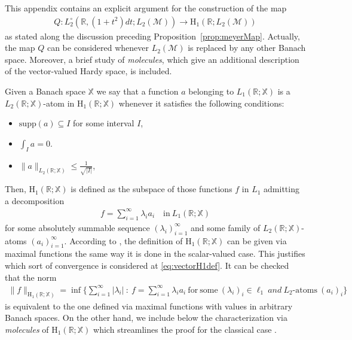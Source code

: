 \documentclass[psamsfonts]{amsart}
\newcommand{\R}{\mathbb{R}}
\newcommand{\Lone}{L_1}
\newcommand{\Ltwo}{L_2}
\newcommand{\Ltwozero}{L_2^\circ}
\newcommand{\Hone}{\mathrm{H}_1}
\begin{document}
    This appendix contains an explicit argument for the construction of the map
    \begin{align*}
        Q: \Ltwozero(\mathbb{R},(1+t^2)dt; \Ltwo(\mathcal M)) \longrightarrow \Hone(\mathbb{R};\Ltwo(\mathcal{M}))
    \end{align*}
    as stated along the discussion preceding Proposition~\ref{prop:meyerMap}. Actually, the map $Q$ can be considered whenever $\Ltwo(\mathcal{M})$ is replaced by any other Banach space. Moreover, a brief study of \emph{molecules}, which give an additional description of the vector-valued Hardy space, is included.
    
    Given a Banach space $\mathbb{X}$ we say that a function $a$ belonging to $\Lone(\R;\mathbb{X})$ is a $\Ltwo(\R;\mathbb{X})$-atom in $\Hone(\R;\mathbb{X})$ whenever it satisfies the following conditions:
    \begin{itemize}
        \item $\mathrm{supp}(a) \subseteq I$ for some interval  $I$,
 \item $\int_{I} a = 0$.
        \item $\|a\|_{\Ltwo(\R;\mathbb{X})} \leq \frac{1}{\sqrt{|I|}}$,
       
    \end{itemize}
    Then, $\Hone(\R;\mathbb{X})$ is defined as the subspace of those functions $f$ in $\Lone$ admitting a decomposition
    \begin{align}\label{eq:vectorH1def}
        f = \sum\limits_{i=1}^\infty \lambda_i  a_i \quad \mathrm{in \ } \Lone(\R;\mathbb{X})
    \end{align}
    for some absolutely summable sequence $(\lambda_i)_{i=1}^\infty$
    and some family of $\Ltwo(\R;\mathbb{X})$-atoms
    $(a_i)_{i=1}^{\infty}$. According to \cite{H06}, the definition
    of $\Hone(\R;\mathbb{X})$ can be given via maximal functions the
    same way it is done in the scalar-valued case. This justifies
    which sort of convergence is considered at
    \eqref{eq:vectorH1def}. It can be checked that the norm
    \begin{align*}
        \|f\|_{\Hone(\R;\mathbb{X})} = \inf\{ \sum_{i=1}^{\infty} |\lambda_i| \ : \ f = \sum_{i=1}^{\infty} \lambda_i a_i \ \mathrm{for \ some \ } (\lambda_i)_i \in \ell_1 \ and \ \Ltwo\textrm{-atoms} \ (a_i)_i \}
    \end{align*}
    is equivalent to the one defined via maximal functions with values in arbitrary Banach spaces. On the other hand, we include below the characterization via \emph{molecules} of $\Hone(\R;\mathbb{X})$ which streamlines the proof for the classical case \cite[Ch. 5 Sec. 5]{Mey90}.
\end{document}
